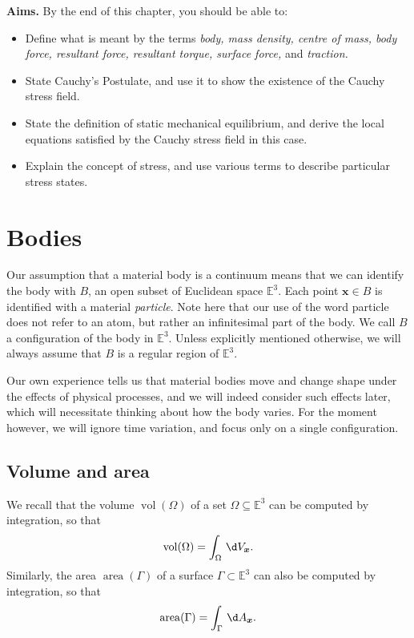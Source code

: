 \documentclass[
  letterpaper,
  DIV=11,
  numbers=noendperiod]{scrreprt}
\theoremstyle{plain}
\theoremstyle{remark}
\begin{document}
\textbf{Aims.} By the end of this chapter, you should be able to:

\begin{itemize}
\item
  Define what is meant by the terms \emph{body, mass density, centre of
  mass, body force, resultant force, resultant torque, surface force,}
  and \emph{traction.}
\item
  State Cauchy's Postulate, and use it to show the existence of the
  Cauchy stress field.
\item
  State the definition of static mechanical equilibrium, and derive the
  local equations satisfied by the Cauchy stress field in this case.
\item
  Explain the concept of stress, and use various terms to describe
  particular stress states.
\end{itemize}

\section{Bodies}\label{bodies}

Our assumption that a material body is a continuum means that we can
identify the body with \(B\), an open subset of Euclidean space
\({\mathbb{E}}^3\). Each point \({\boldsymbol{x}}\in B\) is identified
with a material \emph{particle}. Note here that our use of the word
particle does not refer to an atom, but rather an infinitesimal part of
the body. We call \(B\) a configuration of the body in
\({\mathbb{E}}^3\). Unless explicitly mentioned otherwise, we will
always assume that \(B\) is a regular region of \({\mathbb{E}}^3\).

Our own experience tells us that material bodies move and change shape
under the effects of physical processes, and we will indeed consider
such effects later, which will necessitate thinking about how the body
varies. For the moment however, we will ignore time variation, and focus
only on a single configuration.

\subsection{Volume and area}\label{volume-and-area}

We recall that the volume \({\operatorname{vol}}(\Omega)\) of a set
\(\Omega\subseteq{\mathbb{E}}^3\) can be computed by integration, so
that
\[{\operatorname{vol}}(\Omega) = \int_\Omega {\,\d V_{{\boldsymbol{x}}}}.\]
Similarly, the area \({\operatorname{area}}(\Gamma)\) of a surface
\(\Gamma\subset{\mathbb{E}}^3\) can also be computed by integration, so
that
\[{\operatorname{area}}(\Gamma) = \int_\Gamma {\,\d A_{{\boldsymbol{x}}}}.\]
\end{document}
